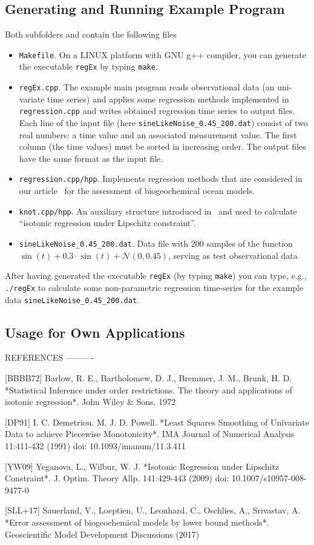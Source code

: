 \documentclass[a4paper]{article}
\begin{document}
\subsection{Generating and Running Example Program}
Both subfolders \texttt{} and \texttt{} contain the following files
\begin{itemize}
\item \texttt{Makefile}. On a LINUX platform with GNU g++ compiler,
you can generate the executable \texttt{regEx} by typing \texttt{make}.
\item \texttt{regEx.cpp}. The example main program reads
observational data (an uni-variate time series)
and applies some regression methods implemented in \texttt{regression.cpp}
and writes obtained regression time series to output files.
Each line of the input file (here \texttt{sineLikeNoise\_0.45\_200.dat})
consist of two real numbers: a time value and an associated measurement value.
The first column (the time values) must be sorted in increasing order.
The output files have the same format as the input file.
\item \texttt{regression.cpp/hpp}. Implements regression methods
that are considered in our article~\cite{SLL+17}
for the assessment of biogeochemical ocean models.
\item \texttt{knot.cpp/hpp}. An auxiliary structure
introduced in~\cite{YW09} and used to calculate
\enquote{isotonic regression under Lipschitz constraint}.
\item \texttt{sineLikeNoise\_0.45\_200.dat}. Data file with 200 samples
of the function $\sin(t)+0.3\cdot \sin(t)+\mathcal{N}(0,0.45)$,
serving as test observational data
\end{itemize}
After having generated the executable \texttt{regEx}
(by typing \texttt{make}) you can type,
e.g., \texttt{./regEx} to calculate
some non-parametric regression time-series
for the example data \texttt{sineLikeNoise\_0.45\_200.dat}.


\subsection{Usage for Own Applications}



REFERENCES
----------

[BBBB72] Barlow, R. E., Bartholomew, D. J., Bremmer, J. M., Brunk, H. D.
         *Statistical Inference under order restrictions. The theory and
         applications of isotonic regression*. John Wiley \& Sons, 1972

[DP91]   I. C. Demetriou. M. J. D. Powell.
         *Least Squares Smoothing of Univariate Data to achieve Piecewise
         Monotonicity*.
         IMA Journal of Numerical Analysis 11:411-432 (1991)
         doi: 10.1093/imanum/11.3.411

[YW09]   Yeganova, L., Wilbur, W. J.
         *Isotonic Regression under Lipschitz Constraint*.
         J. Optim. Theory Allp. 141:429-443 (2009)
         doi: 10.1007/s10957-008-9477-0

[SLL+17] Sauerland, V., Loeptien, U., Leonhard, C., Oschlies, A., Srivastav, A.
         *Error assessment of biogeochemical models by lower bound methods*.
         Geoscientific Model Development Discussions (2017)
\end{document}
